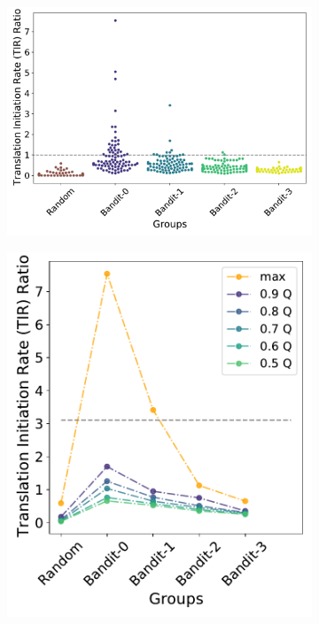 \documentclass{scrartcl}[2013/05/29]%
\begin{document}
\begin{figure}[!ht]
    \centering
    \begin{subfigure}[b]{0.48\textwidth}
        \centering
        \caption{}
        \includegraphics[scale=0.35]{plots/Supplementary/swarmplot_salis.pdf}
    \end{subfigure}
    \begin{subfigure}[b]{0.25\textwidth}
        \centering
        \caption{}
        \includegraphics[scale=0.35]{plots/Supplementary/quantplot_salis.pdf}

\end{subfigure}
\end{figure}
\end{document}
